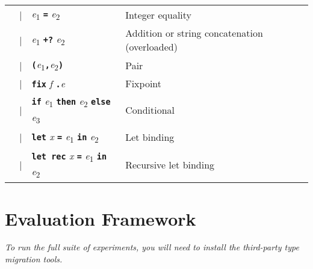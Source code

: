 \documentclass{article}
\newcommand{\kw}[1]{\textbf{\texttt{#1}}}
\newcommand{\metavar}[1]{\textit{#1}}
\begin{document}
\begin{tabular}{rcll}
            & |  & \metavar{e}\textsubscript{1} \kw{=} \metavar{e}\textsubscript{2}
                 & Integer equality \\
            & |  & \metavar{e}\textsubscript{1} \kw{+?} \metavar{e}\textsubscript{2}
                 & Addition or string concatenation (overloaded) \\
            & |  & \kw{(}\metavar{e}\textsubscript{1}\kw{,}\metavar{e}\textsubscript{2}\kw{)}
                 & Pair \\
            & |  & \kw{fix} \metavar{f} \kw{.}\metavar{e}
                 & Fixpoint \\
            & |  & \kw{if} \metavar{e}\textsubscript{1} \kw{then} \metavar{e}\textsubscript{2} \kw{else} \metavar{e}\textsubscript{3}
                 & Conditional \\
            & |  & \kw{let} \metavar{x} \kw{=} \metavar{e}\textsubscript{1} \kw{in} \metavar{e}\textsubscript{2}
                 & Let binding \\
            & |  & \kw{let rec} \metavar{x} \kw{=} \metavar{e}\textsubscript{1} \kw{in} \metavar{e}\textsubscript{2}
                 & Recursive let binding \\

\end{tabular}

\section{Evaluation Framework}

\emph{To run the full suite of experiments, you will need to install the
third-party type migration tools.}
\end{document}

